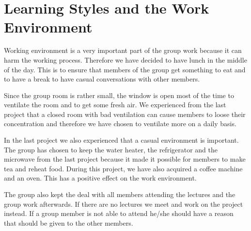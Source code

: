 \section{Learning Styles and the Work Environment}
Working environment is a very important part of the group work because it can harm the working process. Therefore we have decided to have lunch in the middle of the day. This is to ensure that members of the group get something to eat and to have a break to have casual conversations with other members.

Since the group room is rather small, the window is open most of the time to ventilate the room and to get some fresh air. We experienced from the last project that a closed room with bad ventilation can cause members to loose their concentration and therefore we have chosen to ventilate more on a daily basis.

In the last project we also experienced that a casual environment is important. The group has chosen to keep the water heater, the refrigerator and the microwave from the last project because it made it possible for members to make tea and reheat food. During this project, we have also acquired a coffee machine and an oven. This has a positive effect on the work environment.

The group also kept the deal with all members attending the lectures and the group work afterwards. If there are no lectures we meet and work on the project instead.
If a group member is not able to attend he/she should have a reason that should be given to the other members.